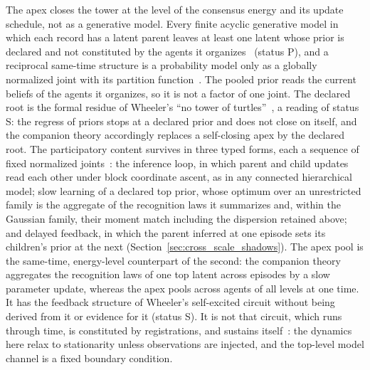 The apex closes the tower at the level of the consensus energy and its update schedule, not as a generative model. Every finite acyclic generative model in which each record has a latent parent leaves at least one latent whose prior is declared and not constituted by the agents it organizes~\cite[Ch.~12, the declared-root proposition]{DennisGaugeVFE2026} (status P), and a reciprocal same-time structure is a probability model only as a globally normalized joint with its partition function~\cite[Ch.~4]{DennisGaugeVFE2026}. The pooled prior reads the current beliefs of the agents it organizes, so it is not a factor of one joint. The declared root is the formal residue of Wheeler's ``no tower of turtles''~\cite{Wheeler1990}, a reading of status S: the regress of priors stops at a declared prior and does not close on itself, and the companion theory accordingly replaces a self-closing apex by the declared root. The participatory content survives in three typed forms, each a sequence of fixed normalized joints~\cite[Ch.~12]{DennisGaugeVFE2026}: the inference loop, in which parent and child updates read each other under block coordinate ascent, as in any connected hierarchical model; slow learning of a declared top prior, whose optimum over an unrestricted family is the aggregate of the recognition laws it summarizes and, within the Gaussian family, their moment match including the dispersion retained above; and delayed feedback, in which the parent inferred at one episode sets its children's prior at the next (Section~\ref{sec:cross_scale_shadows}). The apex pool is the same-time, energy-level counterpart of the second: the companion theory aggregates the recognition laws of one top latent across episodes by a slow parameter update, whereas the apex pools across agents of all levels at one time. It has the feedback structure of Wheeler's self-excited circuit without being derived from it or evidence for it (status S). It is not that circuit, which runs through time, is constituted by registrations, and sustains itself~\cite{Wheeler1983}: the dynamics here relax to stationarity unless observations are injected, and the top-level model channel is a fixed boundary condition.

